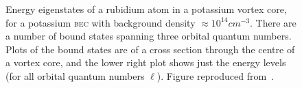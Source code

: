 \begin{figure}
\centering
\noindent{}
\noindent{}
\caption{Energy eigenstates of a rubidium atom in a potassium vortex core, for a potassium \textsc{bec} with background density $\approx 10^{14}\unit{cm}^{-3}$. There are a number of bound states spanning three orbital quantum numbers. Plots of the bound states are of a cross section through the centre of a vortex core, and the lower right plot shows just the energy levels (for all orbital quantum numbers $\ell$). Figure reproduced from~\cite{billington_particle_2010}.}%
\label{fig:levels1e14}%
\end{figure}

